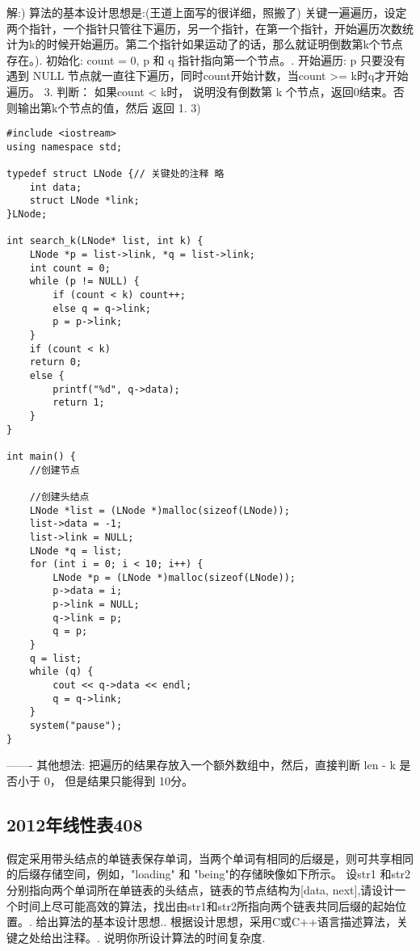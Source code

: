 解:)\newline
算法的基本设计思想是:(王道上面写的很详细，照搬了)\newline
关键一遍遍历，设定两个指针，一个指针只管往下遍历，另一个指针，在第一个指针，开始遍历次数统计为k的时候开始遍历。第二个指针如果运动了的话，那么就证明倒数第k个节点存在。). 初始化: count = 0, p 和 q 指针指向第一个节点。. 开始遍历: p 只要没有遇到 NULL 节点就一直往下遍历，同时count开始计数，当count >= k时q才开始遍历。
3. 判断： 如果count < k时， 说明没有倒数第 k 个节点，返回0结束。否则输出第k个节点的值，然后 返回 1.
3)\newline
\begin{lstlisting}[basicstyle=\small\ttfamily, caption={}, numbers=none]
#include <iostream>
using namespace std;

typedef struct LNode {// 关键处的注释 略
	int data;
	struct LNode *link;
}LNode;

int search_k(LNode* list, int k) {
	LNode *p = list->link, *q = list->link;
	int count = 0;
	while (p != NULL) {
		if (count < k) count++;
		else q = q->link;
		p = p->link;
	}
	if (count < k)
	return 0;
	else {
		printf("%d", q->data);
		return 1;
	}
}

int main() {
	//创建节点
	
	//创建头结点
	LNode *list = (LNode *)malloc(sizeof(LNode));
	list->data = -1;
	list->link = NULL;
	LNode *q = list;
	for (int i = 0; i < 10; i++) {
		LNode *p = (LNode *)malloc(sizeof(LNode));
		p->data = i;
		p->link = NULL;
		q->link = p;
		q = p;
	}
	q = list;
	while (q) {
		cout << q->data << endl;
		q = q->link;
	}
	system("pause");
}
\end{lstlisting}
-------\newline
其他想法:\newline
把遍历的结果存放入一个额外数组中，然后，直接判断 len - k 是否小于 0， 但是结果只能得到 10分。\newline


\subsection{2012年线性表408}
假定采用带头结点的单链表保存单词，当两个单词有相同的后缀是，则可共享相同的后缀存储空间，例如，"loading" 和 "being"的存储映像如下所示。\newline
设str1 和str2 分别指向两个单词所在单链表的头结点，链表的节点结构为[data, next],请设计一个时间上尽可能高效的算法，找出由str1和str2所指向两个链表共同后缀的起始位置。. 给出算法的基本设计思想.. 根据设计思想，采用C或C++语言描述算法，关键之处给出注释。. 说明你所设计算法的时间复杂度. \newline

